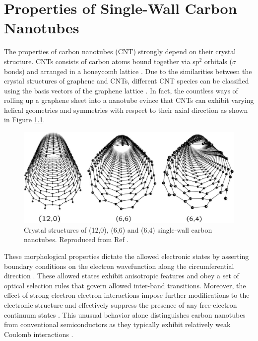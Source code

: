 \chapter{Properties of Single-Wall Carbon Nanotubes}

The properties of carbon nanotubes (CNT) strongly depend on their crystal structure. CNTs consists of carbon atoms bound together via sp$^2$ orbitals ($\sigma$ bonds) and arranged in a honeycomb lattice \cite{soavi2016ultrafast}. Due to the similarities between the crystal structures of graphene and CNTs, different CNT species can be classified using the basis vectors of the graphene lattice \cite{charlier2007electronic}. In fact, the countless ways of rolling up a graphene sheet into a nanotube evince that CNTs can exhibit varying helical geometries and symmetries with respect to their axial direction as shown in Figure \ref{fig:symmetries}. 

\begin{figure}[h]
	\centering
	\includegraphics[scale=0.4]{images/chapter_optical_props/nanotube_symmetries_charlier}
	\caption{Crystal structures of (12,0), (6,6) and (6,4) single-wall carbon nanotubes. Reproduced from Ref \cite{charlier2007electronic}.}
	\label{fig:symmetries}
\end{figure}

These morphological properties dictate the allowed electronic states by asserting boundary conditions on the electron wavefunction along the circumferential direction \cite{charlier2007electronic}. These allowed states exhibit anisotropic features and obey a set of optical selection rules that govern allowed inter-band transitions. Moreover, the effect of strong electron-electron interactions impose further modifications to the electronic structure and effectively suppress the presence of any free-electron continuum states \cite{ando1997excitons}. This unusual behavior alone distinguishes carbon nanotubes from conventional semiconductors as they typically exhibit relatively weak Coulomb interactions \cite{ando1997excitons}.



